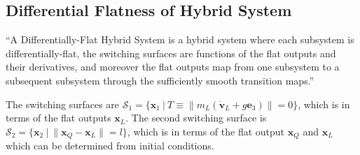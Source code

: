 \documentclass[11pt]{article}
\begin{document}
\newpage
\subsection{Differential Flatness of Hybrid System}

``A Differentially-Flat Hybrid System is a hybrid system where each subsystem is differentially-flat, the switching surfaces are functions of the flat outputs and their derivatives, and moreover the flat outputs map from one subsystem to a subsequent subsystem through the sufficiently smooth transition maps.''

\mbox{} \newline
The switching surfaces are $\mathcal{S}_1 = \{ \mathbf{x}_1 \ | \ T \equiv \| m_L (\mathbf{\dot{v}}_L+g\mathbf{e}_3) \| = 0 \}$, which is in terms of the flat outputs $\mathbf{x}_L$. The second switching surface is $\mathcal{S}_2 = \{ \mathbf{x}_2 \ | \ \| \mathbf{x}_Q - \mathbf{x}_L \| = l \}$, which is in terms of the flat output $\mathbf{x}_Q$ and $\mathbf{x}_L$ which can be determined from initial conditions. 
\end{document}
